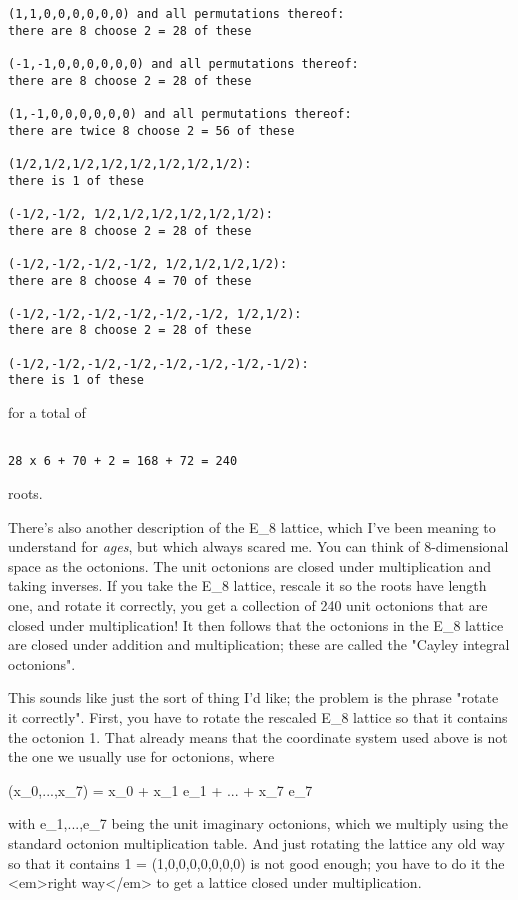 \begin{verbatim}
(1,1,0,0,0,0,0,0) and all permutations thereof:
there are 8 choose 2 = 28 of these

(-1,-1,0,0,0,0,0,0) and all permutations thereof:
there are 8 choose 2 = 28 of these

(1,-1,0,0,0,0,0,0) and all permutations thereof:
there are twice 8 choose 2 = 56 of these

(1/2,1/2,1/2,1/2,1/2,1/2,1/2,1/2):
there is 1 of these 

(-1/2,-1/2, 1/2,1/2,1/2,1/2,1/2,1/2):
there are 8 choose 2 = 28 of these

(-1/2,-1/2,-1/2,-1/2, 1/2,1/2,1/2,1/2):
there are 8 choose 4 = 70 of these

(-1/2,-1/2,-1/2,-1/2,-1/2,-1/2, 1/2,1/2): 
there are 8 choose 2 = 28 of these

(-1/2,-1/2,-1/2,-1/2,-1/2,-1/2,-1/2,-1/2): 
there is 1 of these
\end{verbatim}
    
for a total of 

\begin{verbatim}

28 x 6 + 70 + 2 = 168 + 72 = 240
\end{verbatim}
    
roots.  

There's also another description of the E_{8} lattice, which I've been
meaning to understand for \emph{ages}, but which always scared me.  You can
think of 8-dimensional space as the octonions.  The unit octonions are
closed under multiplication and taking inverses.  If you take the E_{8}
lattice, rescale it so the roots have length one, and rotate it
correctly, you get a collection of 240 unit octonions that are closed
under multiplication!  It then follows that the octonions in the E_{8}
lattice are closed under addition and multiplication; these are called
the "Cayley integral octonions".


This sounds like just the sort of thing I'd like; the problem is the
phrase "rotate it correctly".  First, you have to rotate the
rescaled E_{8} lattice so that it contains the octonion 1.  That already
means that the coordinate system used above is not the one we usually
use for octonions, where

(x_{0},...,x_{7}) = 
x_{0} + x_{1} e_{1} + ... + x_{7} e_{7}


with e_{1},...,e_{7} being the unit imaginary octonions,
which we multiply using the standard octonion multiplication table.  And
just rotating the lattice any old way so that it contains 1 =
(1,0,0,0,0,0,0,0) is not good enough; you have to do it the <em>right
way</em> to get a lattice closed under multiplication.


